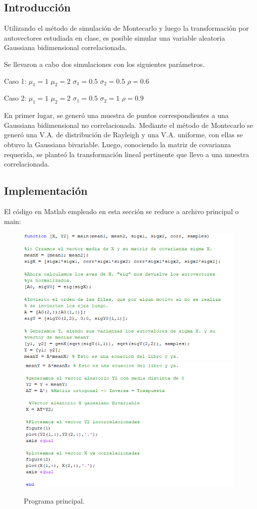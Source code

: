 \subsection*{Introducción}

Utilizando el método de simulación de Montecarlo y luego la transformación por autovectores estudiada en clase, es posible simular una variable aleatoria Gaussiana bidimensional correlacionada.

Se llevaron a cabo dos simulaciones con los siguientes parámetros.

\begin{center}
Caso 1: $\mu_{1} = 1$	 $\mu_{2} = 2$	 $\sigma_{1} = 0.5$	 $\sigma_{2} = 0.5$	 $\rho = 0.6$\label{eq:Parametros 1}

Caso 2: $\mu_{1} = 1$	 $\mu_{2} = 2$	 $\sigma_{1} = 0.5$	 $\sigma_{2} = 1$	 $\rho = 0.9$\label{eq:Parametros 2}

\end{center}

En primer lugar, se generó una muestra de puntos correspondientes a una Gaussiana bidimensional no correlacionada. Mediante el método de Montecarlo se generó una V.A. de distribución de Rayleigh y una V.A. uniforme, con ellas se obtuvo la Gaussiana bivariable. Luego, conociendo la matriz de covarianza requerida, se planteó la transformación lineal pertinente que llevo a una muestra correlacionada.
\\

\subsection*{Implementación}


El código en Matlab empleado en esta sección se reduce a archivo principal o main:
\begin{figure}[H]
	\centering
	\includegraphics[width=0.6\linewidth]{./ImagenesEjercicio2/mainP1.PNG}
	\\
	\includegraphics[width=0.6\linewidth]{./ImagenesEjercicio2/mainP2.PNG}
	\caption{Programa principal.}
	\label{fig:main}
\end{figure}

